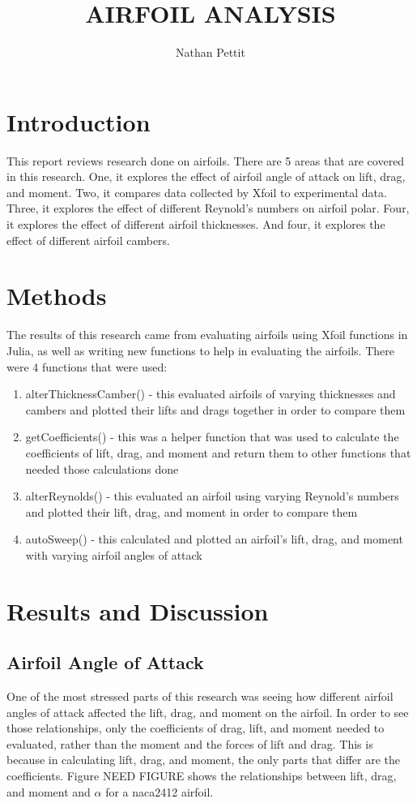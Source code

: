 \documentclass{journal}
\title{AIRFOIL ANALYSIS}
\author{Nathan Pettit}
\begin{document}
	
	\maketitle	
	
	\section{Introduction}
	This report reviews research done on airfoils. There are 5 areas that are covered in this research. One, it explores the effect of airfoil angle of attack on lift, drag, and moment. Two, it compares data collected by Xfoil to experimental data. Three, it explores the effect of different Reynold's numbers on airfoil polar. Four, it explores the effect of different airfoil thicknesses. And four, it explores the effect of different airfoil cambers.
	
	\section{Methods}
	The results of this research came from evaluating airfoils using Xfoil functions in Julia, as well as writing new functions to help in evaluating the airfoils. There were 4 functions that were  used:
	
	\begin{enumerate}
		\item alterThicknessCamber() - this evaluated airfoils of varying thicknesses and cambers and plotted their lifts and drags together in order to compare them
		\item getCoefficients() - this was a helper function that was used to calculate the coefficients of lift, drag, and moment and return them to other functions that needed those calculations done
		\item alterReynolds() - this evaluated an airfoil using varying Reynold's numbers and plotted their lift, drag, and moment in order to compare them
		\item autoSweep() - this calculated and plotted an airfoil's lift, drag, and moment with varying airfoil angles of attack
	\end{enumerate}
	
	\section{Results and Discussion}
	
	\subsection{Airfoil Angle  of Attack}
	One of the most stressed parts of this research was seeing how different airfoil angles of attack affected the lift, drag, and moment on the airfoil. In order to see those relationships, only the coefficients of drag, lift, and moment needed to evaluated, rather than the moment and the forces of lift and drag. This is because in calculating lift, drag, and moment, the only parts that differ are the coefficients. Figure NEED FIGURE shows the relationships between lift, drag, and moment and \(\alpha\) for a naca2412 airfoil.
	
\end{document}
